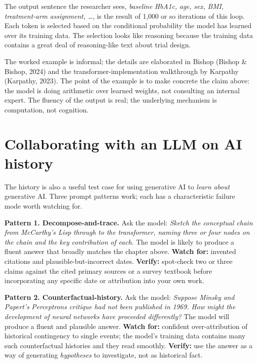 \documentclass[
  letterpaper,
  11pt]{scrbook}
\begin{document}
The output sentence the researcher sees, \emph{baseline HbA1c, age, sex,
BMI, treatment-arm assignment, \ldots{}}, is the result of 1,000 or so
iterations of this loop. Each token is selected based on the conditional
probability the model has learned over its training data. The selection
looks like reasoning because the training data contains a great deal of
reasoning-like text about trial design.

The worked example is informal; the details are elaborated in Bishop
(Bishop \& Bishop, 2024) and the transformer-implementation walkthrough
by Karpathy (Karpathy, 2023). The point of the example is to make
concrete the claim above: the model is doing arithmetic over learned
weights, not consulting an internal expert. The fluency of the output is
real; the underlying mechanism is computation, not cognition.

\section{Collaborating with an LLM on AI
history}\label{collaborating-with-an-llm-on-ai-history}

The history is also a useful test case for using generative AI to
\emph{learn about} generative AI. Three prompt patterns work; each has a
characteristic failure mode worth watching for.

\textbf{Pattern 1. Decompose-and-trace.} Ask the model: \emph{Sketch the
conceptual chain from McCarthy's Lisp through to the transformer, naming
three or four nodes on the chain and the key contribution of each.} The
model is likely to produce a fluent answer that broadly matches the
chapter above. \textbf{Watch for:} invented citations and
plausible-but-incorrect dates. \textbf{Verify:} spot-check two or three
claims against the cited primary sources or a survey textbook before
incorporating any specific date or attribution into your own work.

\textbf{Pattern 2. Counterfactual-history.} Ask the model: \emph{Suppose
Minsky and Papert's Perceptrons critique had not been published in 1969.
How might the development of neural networks have proceeded
differently?} The model will produce a fluent and plausible answer.
\textbf{Watch for:} confident over-attribution of historical contingency
to single events; the model's training data contains many such
counterfactual histories and they read smoothly. \textbf{Verify:} use
the answer as a way of generating \emph{hypotheses} to investigate, not
as historical fact.
\end{document}
